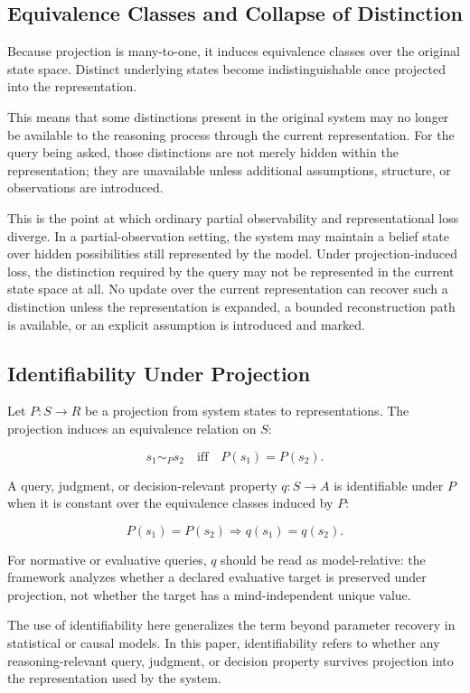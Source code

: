 \documentclass[11pt]{article}
\begin{document}
\subsection{Equivalence Classes and Collapse of Distinction}

Because projection is many-to-one, it induces equivalence classes over the original state space. Distinct underlying states become indistinguishable once projected into the representation.

This means that some distinctions present in the original system may no longer be available to the reasoning process through the current representation. For the query being asked, those distinctions are not merely hidden within the representation; they are unavailable unless additional assumptions, structure, or observations are introduced.

This is the point at which ordinary partial observability and representational loss diverge. In a partial-observation setting, the system may maintain a belief state over hidden possibilities still represented by the model. Under projection-induced loss, the distinction required by the query may not be represented in the current state space at all. No update over the current representation can recover such a distinction unless the representation is expanded, a bounded reconstruction path is available, or an explicit assumption is introduced and marked.

\subsection{Identifiability Under Projection}

Let $P:S\rightarrow R$ be a projection from system states to representations. The projection induces an equivalence relation on $S$:

\[
s_1 \sim_P s_2 \quad \text{iff} \quad P(s_1)=P(s_2).
\]

A query, judgment, or decision-relevant property $q:S\rightarrow A$ is identifiable under $P$ when it is constant over the equivalence classes induced by $P$:

\[
P(s_1)=P(s_2) \Rightarrow q(s_1)=q(s_2).
\]

For normative or evaluative queries, \(q\) should be read as model-relative: the framework analyzes whether a declared evaluative target is preserved under projection, not whether the target has a mind-independent unique value.

The use of identifiability here generalizes the term beyond parameter recovery in statistical or causal models. In this paper, identifiability refers to whether any reasoning-relevant query, judgment, or decision property survives projection into the representation used by the system.
\end{document}
